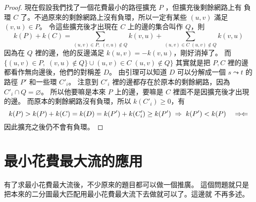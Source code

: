 \documentclass[a4paper,12pt]{book}
\begin{document}
\begin{proof}
  \begin{comment}
  我們先提出一個簡單的引理。
\begin{lemma}
  定義兩個集合的對稱差 $A \oplus B = (A \setminus B) \cup (B \setminus A)$。
  也就是只出現在其中一個集合裡的元素。

  一個 $s$ 到 $t$ 的路徑 $P$ 和一個環 $C$ 的對稱差可以分解成一個從 $s$ 到 $t$
  的路徑和一些環。
\end{lemma}
\begin{proof}
  補上 $(t, s)$，那條路徑就變成一個環了。與前面的引理類似，
  因為原本環上的點的度數都是偶數，
  他們對稱差後度數仍是偶數，所以如果有 $(u_1, u_2)$ 的邊
  ，$u_2$ 也一定還能再找到一條邊出去。用類
  似剛剛引理的方法討論可以知道他們的對稱差可以分解成一些環，而
  $(t, s)$ 會屬於某個環，刪掉這條邊那個環就變成一個 $s \leadsto t$ 的
  路徑了。
\end{proof}

  現在假設我們找了一個花費最小的路徑擴充 $P$ ，但擴充後剩餘網路上有
  負環 $C$ 了。不過原來的剩餘網路上沒有負環，所以一定有某些 $(u, v)$
  滿足 $(v, u) \in P$。 現在令 $\hat{Z} = \hat{P} \oplus \hat{C}$，
  其中 $\hat{G}$ 是把 $G$ 裡的有向邊當成無向邊得出的新圖，則 $\bar{Z}$
  由引理可以分解成一個 $s \leadsto t$ 的路徑和一些環，也因此可以被
  重新定向成有向圖 $Z$，包含了一條從 $s \leadsto t$ 的路徑和一些
  有向環，注意到。
\end{comment}
  現在假設我們找了一個花費最小的路徑擴充 $P$ ，但擴充後剩餘網路上有
  負環 $C$ 了。不過原來的剩餘網路上沒有負環，所以一定有某些 $(u, v)$
  滿足 $(v, u) \in P$。 令這些擴充後才出現在 $C$ 上的邊的集合叫作 $Q$，則
  \[ k(P) + k(C) = \sum_{(u, v) \in P, \;(v, u) \notin Q} k(v, u) +
    \sum_{(u, v) \in C \; (u, v) \notin Q} k(v, u) \]
  因為在 $Q$ 裡的邊，他的反邊滿足 $k(u, v) = -k(v, u)$，剛好消掉了。
  而 $\{(u, v) \in P, \;(v, u) \notin Q\} \cup (u, v) \in C \; (u, v) \notin Q\}$
  其實就是把 $P, C$ 裡的邊都看作無向邊後，他們的對稱差 $D$。 由引理可以知道
  $D$ 可以分解成一個 $s \leadsto t$ 的路徑 $P'$ 和一些環 $C'_i$。
  注意到 $C'_i$ 裡的邊都存在於原本的剩餘網路，因為 $C'_i \cap Q = \varnothing$。
  所以他要嘛是本來 $P$ 上的邊，要嘛是 $C$ 裡面不是因擴充後才出現的邊。
  而原本的剩餘網路沒有負環，所以 $k(C'_i) \geq 0$，有
  \[ k(P) > k(P) + k(C) = k(D) = k(P') + k(C'_i) \geq k(P') \;\Rightarrow\; k(P') < k(P) 
    \quad \Rightarrow\hspace*{-1pt}\Leftarrow\]
  因此擴充之後仍不會有負環。
\end{proof}

\section{最小花費最大流的應用}
有了求最小花費最大流後，不少原來的題目都可以做一個推廣。
這個問題就只是把本來的二分圖最大匹配用最小花費最大流下去做就可以了。這邊就
不再多述。
\end{document}
